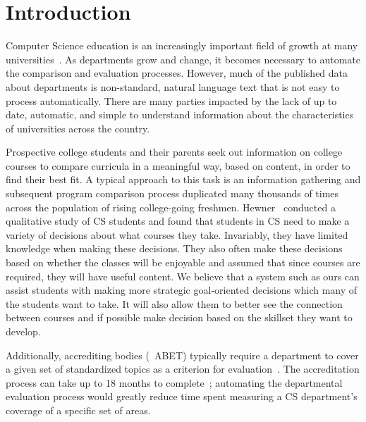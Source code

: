 \section{Introduction}
\label{sec:introduction}


Computer Science education is an increasingly important field of growth at many universities~\cite{zweben2011,klawe2005}.
As departments grow and change, it becomes necessary to automate the comparison and evaluation processes.
However, much of the published data about departments is non-standard, natural language text that is not easy to process automatically.
There are many parties impacted by the lack of up to date, automatic, and simple to understand information about the characteristics of universities across the country.


Prospective college students and their parents seek out information on college courses to compare curricula in a meaningful way, based on content, in order to find their best fit.
A typical approach to this task is an information gathering and subsequent program comparison process duplicated many thousands of times across the population of rising college-going freshmen.
Hewner~\cite{hewner2014} conducted a qualitative study of CS students and found that students in CS need to make a variety of decisions about what courses they take.
Invariably, they have limited knowledge when making these decisions.
They also often make these decisions based on whether the classes will be enjoyable and assumed that since courses are required, they will have useful content.
We believe that a system such as ours can assist students with making more strategic goal-oriented decisions which many of the students want to take.
It will also allow them to better see the connection between courses and if possible make decision based on the skillset they want to develop.


Additionally, accrediting bodies (\eg\ ABET) typically require a department to cover a given set of standardized topics as a criterion for evaluation~\cite{ABET2015}.
The accreditation process can take up to 18 months to complete~\cite{ABET2015}; automating the departmental evaluation process would greatly reduce time spent measuring a CS department's coverage of a specific set of areas.

